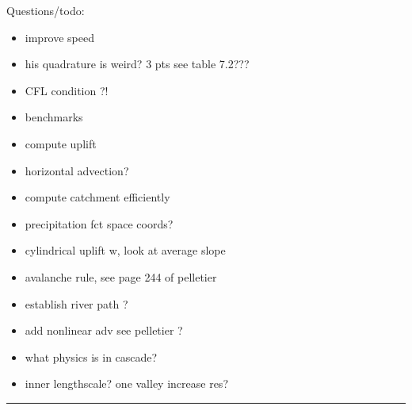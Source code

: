 Questions/todo:
\begin{itemize}
\item
improve speed
\item
his quadrature is weird?  3 pts see table 7.2???
\item
CFL condition ?!
\item
benchmarks
\item
compute uplift 
\item
horizontal advection? 
\item
compute catchment efficiently
\item
precipitation fct space coords?
\item
cylindrical uplift w, look at average slope
\item
avalanche rule, see page 244 of pelletier
\item
establish river path ?
\item
add nonlinear adv see pelletier ?
\item
what physics is in cascade?
\item
inner lengthscale? one valley increase res?
\end{itemize}

\par\noindent\rule{\textwidth}{0.4pt}

\\
\\
